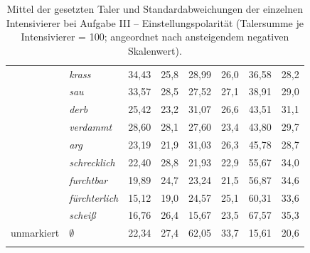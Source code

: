 \begin{table}
{\begin{tabularx}{\textwidth}{Xlrrrrrr}
  \rowcolor[gray]{.90}
            & \textit{krass} &  34,43 & 25,8 & 28,99 &  26,0 & 36,58 &  28,2\\
            & \textit{sau}   &  33,57 & 28,5 & 27,52 &  27,1 & 38,91 &  29,0\\
  \rowcolor[gray]{.90}
            & \textit{derb}  &  25,42 & 23,2 & 31,07 &  26,6 & 43,51 &  31,1\\
        & \textit{verdammt}  &  28,60 & 28,1 & 27,60 &  23,4 & 43,80 &  29,7\\
  \rowcolor[gray]{.90}
              & \textit{arg} &  23,19 & 21,9 & 31,03 &  26,3 & 45,78 &  28,7\\
      & \textit{schrecklich} &  22,40 & 28,8 & 21,93 &  22,9 & 55,67 &  34,0\\
  \rowcolor[gray]{.90}
        & \textit{furchtbar} &  19,89 & 24,7 & 23,24 &  21,5 & 56,87 &  34,6\\
     & \textit{fürchterlich} &  15,12 & 19,0 & 24,57 &  25,1 & 60,31 &  33,6\\
  \rowcolor[gray]{.90}
           & \textit{scheiß} &  16,76 & 26,4 & 15,67 &  23,5 & 67,57 &  35,3\\
\multicolumn{1}{l}{unmarkiert} & \textit{$\emptyset$} &  22,34 & 27,4 & 62,05 &  33,7 & 15,61 &  20,6\\
\lspbottomrule
\end{tabularx}
}
\caption[Mittel der gesetzten Taler der einzelnen Intensivierer bei Aufgabe III von Experiment 1]{Mittel der gesetzten Taler und Standardabweichungen der einzelnen Intensivierer bei Aufgabe III -- Einstellungspolarität (Talersumme je Intensivierer = 100; angeordnet nach ansteigendem negativen Skalenwert).}
\label{ValenzInten}
\end{table}


